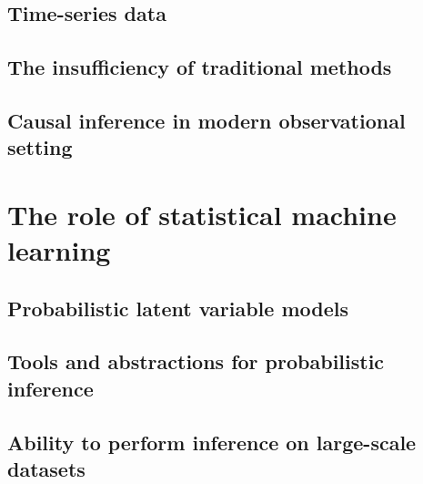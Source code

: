 \subsection{Time-series data}

\subsection{The insufficiency of traditional methods}

\subsection{Causal inference in modern observational setting}

\section{The role of statistical machine learning}

\subsection{Probabilistic latent variable models}

\subsection{Tools and abstractions for probabilistic inference}

\subsection{Ability to perform inference on large-scale datasets}

